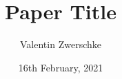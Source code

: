 
\usepackage[utf8]{inputenc}
\usepackage[T2A]{fontenc}
\usepackage[margin=0.7in]{geometry}
\usepackage[titletoc,title]{appendix}

\usepackage{float}
\usepackage{graphicx}
\title{Paper Title}
\author{Valentin Zwerschke}
\date{16th February, 2021}



\maketitle


